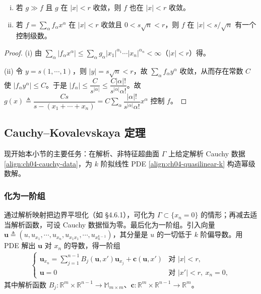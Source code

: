 \documentclass[../../main.tex]{subfiles}
\begin{document}
\begin{lemma}[控制级数]\label{lemma:ch04-majorant}
\begin{enumerate}[(i)]
\item 若 $g\gg f$ 且 $g$ 在 $|x|<r$ 收敛，则 $f$ 也在 $|x|<r$ 收敛。
\item 若 $f=\sum_\alpha f_\alpha x^\alpha$ 在 $|x|<r$ 收敛且 $0<s\sqrt{n}<r$，则 $f$ 在 $|x|<s/\sqrt{n}$ 有一个控制级数。
\end{enumerate}
\end{lemma}

\begin{proof}
(i) 由 $\sum_\alpha|f_\alpha x^\alpha|\leqslant\sum_\alpha g_\alpha|x_1|^{\alpha_1}\cdots|x_n|^{\alpha_n}<\infty$（$|x|<r$）得。

(ii) 令 $y=s(1,\cdots,1)$，则 $|y|=s\sqrt{n}<r$，故 $\sum_\alpha f_\alpha y^\alpha$ 收敛，从而存在常数 $C$ 使 $|f_\alpha y^\alpha|\leqslant C$。于是 $|f_\alpha|\leqslant\dfrac{C}{s^{|\alpha|}}\leqslant\dfrac{C|\alpha|!}{s^{|\alpha|}\alpha!}$。故 $g(x)\triangleq\dfrac{Cs}{s-(x_1+\cdots+x_n)}=C\sum_\alpha\dfrac{|\alpha|!}{s^{|\alpha|}\alpha!}x^\alpha$ 控制 $f$。
\end{proof}

\subsection{Cauchy--Kovalevskaya 定理}\label{subsection:ch04-ck}

现开始本小节的主要任务：在解析、非特征超曲面 $\Gamma$ 上给定解析 Cauchy 数据\eqref{align:ch04-cauchy-data}，为 $k$ 阶拟线性 PDE \eqref{align:ch04-quasilinear-k} 构造幂级数解。

\subsubsection{化为一阶组}

通过解析映射把边界平坦化（如 \S4.6.1），可化为 $\Gamma\subset\{x_n=0\}$ 的情形；再减去适当解析函数，可设 Cauchy 数据恒为零。最后化为一阶组。引入向量 $\mathbf{u}\triangleq(u,u_{x_1},\cdots,u_{x_n},u_{x_1x_1},\cdots,u_{x_n^{k-1}})$，其分量是 $u$ 的一切低于 $k$ 阶偏导数。用 PDE 解出 $\mathbf{u}$ 对 $x_n$ 的导数，得一阶组
\begin{align}\label{align:ch04-first-order-system}
\begin{cases}
\mathbf{u}_{x_n}=\sum_{j=1}^{n-1}B_j(\mathbf{u},x')\mathbf{u}_{x_j}+\mathbf{c}(\mathbf{u},x') & \text{对 }|x|<r,\\
\mathbf{u}=0 & \text{对 }|x'|<r,\ x_n=0,
\end{cases}
\end{align}
其中解析函数 $B_j:\mathbb{R}^m\times\mathbb{R}^{n-1}\to\mathbb{M}_{m\times m}$、$\mathbf{c}:\mathbb{R}^m\times\mathbb{R}^{n-1}\to\mathbb{R}^m$。
\end{document}
